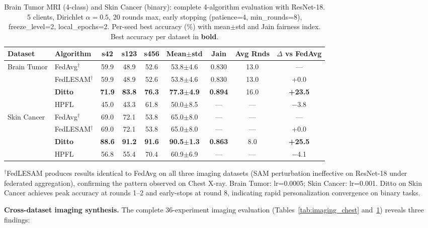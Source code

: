 \documentclass[conference]{IEEEtran}
\begin{document}
\begin{table}[htbp]
\centering
\caption{Brain Tumor MRI (4-class) and Skin Cancer (binary): complete 4-algorithm evaluation with ResNet-18. 5 clients, Dirichlet $\alpha{=}0.5$, 20 rounds max, early stopping (patience=4, min\_rounds=8), freeze\_level=2, local\_epochs=2. Per-seed best accuracy (\%) with mean$\pm$std and Jain fairness index. Best accuracy per dataset in \textbf{bold}.}
\label{tab:imaging_bt_sc_full}
\small
\begin{tabular}{llccccccc}
\toprule
\textbf{Dataset} & \textbf{Algorithm} & \textbf{s42} & \textbf{s123} & \textbf{s456} & \textbf{Mean$\pm$std} & \textbf{Jain} & \textbf{Avg Rnds} & \textbf{$\Delta$ vs FedAvg} \\
\midrule
\multirow{4}{*}{Brain Tumor} & FedAvg$^\dagger$ & 59.9 & 48.9 & 52.6 & 53.8$\pm$4.6 & 0.830 & 13.0 & --- \\
 & FedLESAM$^\dagger$ & 59.9 & 48.9 & 52.6 & 53.8$\pm$4.6 & 0.830 & 13.0 & +0.0 \\
 & \textbf{Ditto} & \textbf{71.9} & \textbf{83.8} & \textbf{76.3} & \textbf{77.3$\pm$4.9} & \textbf{0.894} & 16.0 & \textbf{+23.5} \\
 & HPFL & 45.0 & 43.3 & 61.8 & 50.0$\pm$8.5 & --- & --- & $-$3.8 \\
\midrule
\multirow{4}{*}{Skin Cancer} & FedAvg$^\dagger$ & 69.0 & 72.1 & 53.8 & 65.0$\pm$8.0 & --- & --- & --- \\
 & FedLESAM$^\dagger$ & 69.0 & 72.1 & 53.8 & 65.0$\pm$8.0 & --- & --- & +0.0 \\
 & \textbf{Ditto} & \textbf{88.6} & \textbf{91.2} & \textbf{91.6} & \textbf{90.5$\pm$1.3} & \textbf{0.863} & 8.0 & \textbf{+25.5} \\
 & HPFL & 56.8 & 55.4 & 70.4 & 60.9$\pm$6.9 & --- & --- & $-$4.1 \\
\bottomrule
\end{tabular}
\par{\footnotesize $^\dagger$FedLESAM produces results identical to FedAvg on all three imaging datasets (SAM perturbation ineffective on ResNet-18 under federated aggregation), confirming the pattern observed on Chest X-ray. Brain Tumor: lr=0.0005; Skin Cancer: lr=0.001. Ditto on Skin Cancer achieves peak accuracy at rounds 1--2 and early-stops at round 8, indicating rapid personalization convergence on binary tasks.}
\end{table}

\textbf{Cross-dataset imaging synthesis.} The complete 36-experiment imaging evaluation (Tables~\ref{tab:imaging_chest} and~\ref{tab:imaging_bt_sc_full}) reveals three findings:
\end{document}
